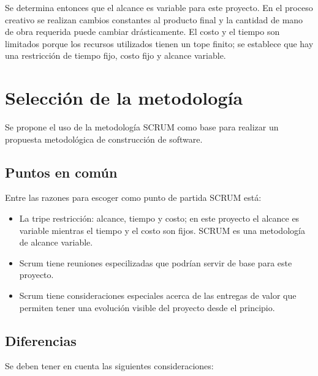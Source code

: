 Se determina entonces que el alcance es variable para este proyecto. En el proceso creativo se realizan cambios constantes al producto final y la cantidad de mano de obra requerida puede cambiar drásticamente. El costo y el tiempo son limitados porque los recursos utilizados tienen un tope finito; se establece que hay una restricción de tiempo fijo, costo fijo y alcance variable.

\section{Selección de la metodología}

Se propone el uso de la metodología SCRUM como base para realizar un propuesta metodológica de construcción de software.

\subsection{Puntos en común}

Entre las razones para escoger como punto de partida SCRUM está:

\begin{itemize}
  \item La tripe restricción: alcance, tiempo y costo; en este proyecto el alcance es variable mientras el tiempo y el costo son fijos. SCRUM es una metodología de alcance variable.
  \item Scrum tiene reuniones especilizadas que podrían servir de base para este proyecto.
  \item Scrum tiene consideraciones especiales acerca de las entregas de valor que permiten tener una evolución visible del proyecto desde el principio.
\end{itemize}

\subsection{Diferencias}

Se deben tener en cuenta las siguientes consideraciones:

